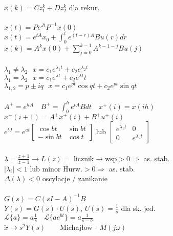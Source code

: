 \documentclass[a4paper,10pt]{article}
\begin{document}
\noindent
$x(k)=Cz_1^k+Dz_2^k$ dla rekur.\\
\\
$x(t)=Pe^{Jt}P^{-1}x(0)$\\
$x(t)=e^{tA}x_0+\int^t_0e^{(t-r)A}Bu(r) dr$\\
$x(k)=A^kx(0)+\sum^{k-1}_{j=0}A^{k-1-j}Bu(j)$\\
\\
$\lambda_1 \neq \lambda_2 \ \ \ x = c_1e^{\lambda_1t}+c_2e^{\lambda_2t}$\\
$\lambda_1 =  \lambda_2 \ \ \ x = c_1e^{\lambda t}+c_2e^{\lambda t}t$\\
$\lambda_{1,2} =p \pm iq  \ \ \ x = c_1e^{p t}\cos qt+c_2e^{p t} \sin qt$\\
\\
$A^+=e^{hA} \ \ \ $
$B^+=\int^h_0e^{tA}B dt \ \ \ $%
$x^+(i)=x(ih)$\\
$x^+(i+1)=A^+x^+(i)+B^+u^+(i)$\\
$e^{tJ}=e^{a t}\left[\begin{array}{cc}\cos bt&\sin bt\\-\sin bt& \cos t\end{array}\right]$ lub $\left[\begin{array}{cc}e^{\lambda_1 t}&0\\0&e^{\lambda_2 t}\end{array}\right]$\\
\\
$\lambda=\frac{z+1}{z-1} \rightarrow L(z) = \text{ licznik} \rightarrow \text{wsp} >0 \Rightarrow$ as. stab.\\
$|\lambda_i|<1$ lub minor Hurw.$>0 \Rightarrow$ as. stab.\\
$\Delta(\lambda)<0$  oscylacje / zanikanie\\
\\
$G(s)=C(sI-A)^{-1}B$\\
$Y(s)=G(s) \cdot U(s)$, $U(s)=\frac 1 s  $ dla sk. jed.\\
$\mathcal{L}\{a\}=a\frac 1 s \ \ \ \ \mathcal{L}\{ae^{bt}\}=a\frac {1}{s-b}$\\
$\ddot{x} \rightarrow s^2Y(s)\ \ \ \ \ \ \ \ \ $Michajłow - $M(j\omega)$\\
\end{document}
